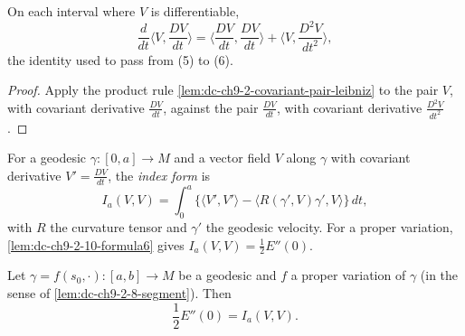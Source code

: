 \begin{lemma}
  \label{lem:dc-ch9-2-10-differentiation}


  On each interval where $V$ is differentiable,
  $$
  \frac{d}{dt}\Big\langle V,\frac{DV}{dt}\Big\rangle
    =\Big\langle\frac{DV}{dt},\frac{DV}{dt}\Big\rangle
     +\Big\langle V,\frac{D^2V}{dt^2}\Big\rangle,
  $$
  the identity used to pass from (5) to (6).
\end{lemma}
\begin{proof}

  \sketch
  Apply the product rule \cref{lem:dc-ch9-2-covariant-pair-leibniz} to the pair $V$, with
  covariant derivative $\frac{DV}{dt}$, against the pair $\frac{DV}{dt}$, with covariant
  derivative $\frac{D^2V}{dt^2}$.
\end{proof}
\begin{definition}
  \label{def:dc-ch9-2-10-index-form}


  For a geodesic $\gamma:[0,a]\to M$ and a vector field $V$ along $\gamma$ with covariant
  derivative $V'=\frac{DV}{dt}$, the \emph{index form} is
  $$
  I_a(V,V)=\int_0^a\{\langle V',V'\rangle-\langle R(\gamma',V)\gamma',V\rangle\}\,dt,
  $$
  with $R$ the curvature tensor and $\gamma'$ the geodesic velocity. For a
  proper variation, \cref{lem:dc-ch9-2-10-formula6} gives
  $I_a(V,V)=\frac{1}{2}E''(0)$.
\end{definition}
\begin{lemma}
  \label{lem:dc-ch9-2-10-formula6}


  Let $\gamma=f(s_0,\cdot):[a,b]\to M$ be a geodesic and $f$ a proper variation of $\gamma$
  (in the sense of \cref{lem:dc-ch9-2-8-segment}). Then
  $$
  \frac{1}{2}E''(0)=I_a(V,V).
  $$
\end{lemma}
